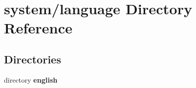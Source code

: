 \section{system/language Directory Reference}
\label{dir_d41f23e53a69e2b299eca087a7740460}
\subsection*{Directories}
\begin{DoxyCompactItemize}
\item 
directory {\bf english}
\end{DoxyCompactItemize}
